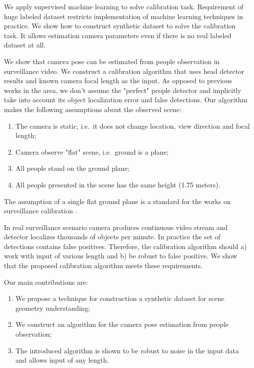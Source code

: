 We apply supervised machine learning to solve calibration task. Requirement of huge labeled dataset restricts implementation of machine learning techniques in practice. We show how to construct synthetic dataset to solve the calibration task. It allows estimation camera parameters even if there is no real labeled dataset at all.

We show that camera pose can be estimated from people observation in surveillance video. We construct a calibration algorithm that uses head detector results and known camera focal length as the input. As opposed to previous works in the area, we don't assume the "perfect" people detector and implicitly take into account its object localization error and false detections. Our algorithm makes the following assumptions about the observed scene:
\begin{enumerate}
	\item The camera is static, i.e.\ it does not change location, view direction and focal length;
	\item Camera observe "flat" scene, i.e.\ ground is a plane;
	\item All people stand on the ground plane;
	\item All people presented in the scene has the same height (1.75 meters).
\end{enumerate}
The assumption of a single flat ground plane is a standard for the works on surveillance calibration \cite{liu2011surveillance,chen2007accurate,dubska2014automatic,den2015automatic,micusik2010simultaneous}.

In real surveillance scenario camera produces continuous video stream and detector localizes thousands of objects per minute. In practice the set of detections contains false positives. Therefore, the calibration algorithm should a) work with input of various length and b) be robust to false positive. We show that the proposed calibration algorithm meets these requirements.

Our main contributions are:
\begin{enumerate}
	\item We propose a technique for construction a synthetic dataset for scene geometry understanding;
	\item We construct an algorithm for the camera pose estimation from people observation;
	\item The introduced algorithm is shown to be robust to noise in the input data and allows input of any length.
\end{enumerate}


